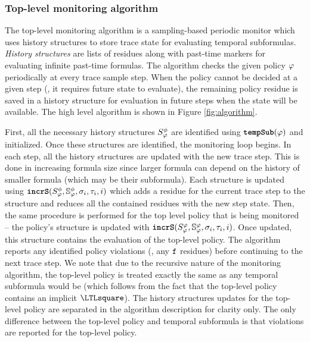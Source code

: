 \subsubsection{Top-level monitoring algorithm}
The top-level monitoring algorithm \monitor is a sampling-based periodic monitor which uses history structures to store trace state for evaluating temporal subformulas. \emph{History structures} are lists of residues along with past-time markers for evaluating infinite past-time formulas. 
The algorithm checks the given policy $\policy$ periodically at every trace sample step. 
When the policy cannot be decided at a given step (\eg, it requires future state to evaluate), the remaining policy residue is saved in a history structure for evaluation in future steps when the state will be available.
The high level algorithm \monitor is shown in Figure \ref{fig:algorithm}. 

First, all the necessary history structures $\histst[\policyv]{ }$ are identified using $\tempSub(\policy)$ and initialized. 
Once these structures are identified, the monitoring loop begins.
%
In each step, all the history structures are updated with the new trace step. 
This is done in increasing formula size since larger formula can depend on the history of smaller formula (which may be their subformula).
%
Each structure is updated using $\incrS(\histst[\policyv]{i-1},\histSt[\policyv]{i}, \sigma_i, \tau_i, i)$ which adds a residue for the current trace step to the structure and reduces all the contained residues with the new step state. 
Then, the same procedure is performed for the top level policy that is being monitored -- the policy's structure is updated with $\incrS(\histst{i-1},\histSt{i},\sigma_i,\tau_i, i)$.
Once updated, this structure contains the evaluation of the top-level policy. The algorithm reports any identified policy violations (\ie, any $\false$ residues) before continuing to the next trace step.
%
We note that due to the recursive nature of the monitoring algorithm, the top-level policy is treated exactly the same as any temporal subformula would be (which follows from the fact that the top-level policy contains an implicit $\henceforth$). 
The history structures updates for the top-level policy are separated in the algorithm description for clarity only.
The only difference between the top-level policy and temporal subformula is that violations are reported for the top-level policy. 

